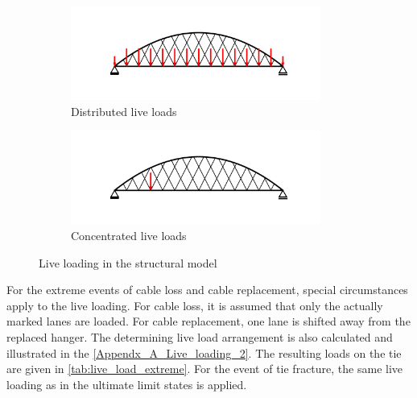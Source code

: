 
\begin{figure}[H]
\centering
\begin{subfigure}{0.5\textwidth}
    \centering
    \includegraphics[trim={0 0.8cm 0 0.8cm},clip, width=0.9\textwidth]{illustrations/figures/distributed live loads.png}
    \caption{Distributed live loads}
    \label{fig:Live_load_1}
\end{subfigure}%
\begin{subfigure}{.5\textwidth}
    \centering
    \includegraphics[trim={0 0.8cm 0 0.8cm},clip, width=0.9\textwidth]{illustrations/figures/concentrated live loads.png}
    \caption{Concentrated live loads}
    \label{fig:Live_load_2}
\end{subfigure}
\caption{Live loading in the structural model}
\label{fig:Live_load}
\end{figure}

For the extreme events of cable loss and cable replacement, special circumstances apply to the live loading. For cable loss, it is assumed that only the actually marked lanes are loaded. For cable replacement, one lane is shifted away from the replaced hanger. The determining live load arrangement is also calculated and illustrated in the \cref{Appendx_A_Live_loading_2}. The resulting loads on the tie are given in \cref{tab:live_load_extreme}. For the event of tie fracture, the same live loading as in the ultimate limit states is applied.

